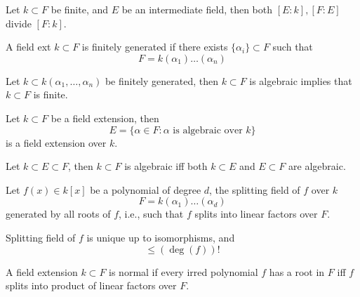 \documentclass[openany]{book}
\begin{document}
\begin{cor}
    Let $k\subset F$ be finite, and $E$ be an intermediate field, then both $[E:k],[F:E]$ divide $[F:k]$.
\end{cor}

\begin{defn}
    A field ext $k\subset F$  is finitely generated if there exists $\{\alpha_i\}\subset F$ such that 
    \begin{equation*}
        F=k(\alpha_1)\dots(\alpha_n)
    \end{equation*}
\end{defn}


\begin{prop}
    Let $k\subset k(\alpha_1,\dots,\alpha_n)$ be finitely generated, then
    $k\subset F$ is algebraic implies that $k\subset F$ is finite.
\end{prop}


\begin{cor}
    Let $k\subset F$ be a field extension, then 
    \begin{equation*}
        E=\{\alpha\in F: \alpha\text{ is algebraic over $k$}\}
    \end{equation*}
    is a field extension over $k$.
\end{cor}

\begin{cor}
    Let $k\subset E\subset F$, then $k\subset F$ is algebraic iff both $k\subset E$ and $E\subset F$ are algebraic.
\end{cor}


\begin{defn}
    Let $f(x)\in k[x]$ be a polynomial of degree $d$, the splitting field of $f$ over $k$ 
    \begin{equation*}
        F=k(\alpha_1)\dots(\alpha_d)
    \end{equation*}
    generated by all roots of $f$, i.e., such that $f$ splits into linear factors over $F$.
\end{defn}

\begin{prop}
    Splitting field of $f$ is unique up to isomorphisms, and 
    \begin{equation*}
        [F:k]\leq(\deg(f))!
    \end{equation*}
\end{prop}


\begin{defn}
    A field extension $k\subset F$ is normal if every irred polynomial $f$ has a root in $F$ iff $f$ splits into product of linear factors over $F$.
\end{defn}
\end{document}
